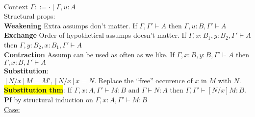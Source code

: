 %
%
\\ Context $\Gamma ::= \cdot \mid \Gamma, u: A$
\\ Structural props:
\\ \textbf{Weakening} Extra assumps don't matter. If $\Gamma, \Gamma'
\vdash A$ then $\Gamma, u : B, \Gamma' \vdash A$
\\ \textbf{Exchange} Order of hypothetical assumps doesn't matter. If
$\Gamma, x : B_1, y:B_2, \Gamma' \vdash A$ then $\Gamma, y : B_2,
x:B_1, \Gamma' \vdash A$
\\ \textbf{Contraction} Assump can be used as often as we like. If
$\Gamma, x: B, y:B, \Gamma' \vdash A$ then $\Gamma, x : B, \Gamma'
\vdash A$
\\ \textbf{Substitution}:
\\$[N/x]M = M', [N/x]x = N$. Replace the ``free'' occurence of $x$ in
$M$ with $N$.
\\ \colorbox{yellow}{\textbf{Substitution thm}}: If $\Gamma, x : A, \Gamma' \vdash M:B$ and
$\Gamma \vdash N:A$ then $\Gamma, \Gamma' \vdash [N/x]M:
B$.
\\ \textbf{Pf}  by structural induction on $\Gamma, x : A, \Gamma'
\vdash M : B$
\\ \underline{Case:} 
